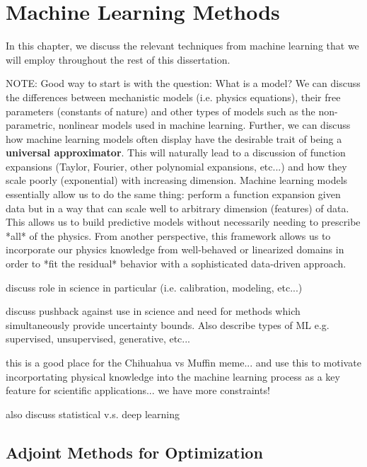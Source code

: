 \chapter{Machine Learning Methods}




In this chapter, we discuss the relevant techniques from machine learning that we will employ throughout the rest of this dissertation.  






NOTE: Good way to start is with the question: What is a model? We can discuss the differences between mechanistic models (i.e. physics equations), their free parameters (constants of nature) and other types of models such as the non-parametric, nonlinear models used in machine learning. Further, we can discuss how machine learning models often display have the desirable trait of being a \textbf{universal approximator}. This will naturally lead to a discussion of function expansions (Taylor, Fourier, other polynomial expansions, etc...) and how they scale poorly (exponential) with increasing dimension. Machine learning models essentially allow us to do the same thing: perform a function expansion given data but in a way that can scale well to arbitrary dimension (features) of data. This allows us to build predictive models without necessarily needing to prescribe *all* of the physics. From another perspective, this framework allows us to incorporate our physics knowledge from well-behaved or linearized domains in order to *fit the residual* behavior with a sophisticated data-driven approach.

discuss role in science in particular (i.e. calibration, modeling, etc...)

discuss pushback against use in science and need for methods which simultaneously provide uncertainty bounds. Also describe types of ML e.g. supervised, unsupervised, generative, etc...

this is a good place for the Chihuahua vs Muffin meme... and use this to motivate incorportating physical knowledge into the machine learning process as a key feature for scientific applications... we have more constraints!

also discuss statistical v.s. deep learning



\section{Adjoint Methods for Optimization}

